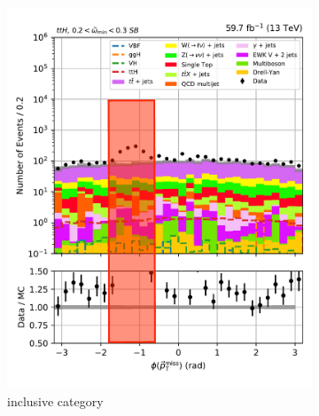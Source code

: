 \begin{figure}[htbp]
    \centering
    \begin{subfigure}[b]{0.4\textwidth}
        \includegraphics[width=\textwidth]{figures/hem_issue/sideband_4/met_phi/met_phi_ttH_before_annotated.pdf}
        \caption{\ttH inclusive category}
    \end{subfigure}
    \hspace{0.1\textwidth}
    \begin{subfigure}[b]{0.4\textwidth}

\end{subfigure}
\end{figure}
